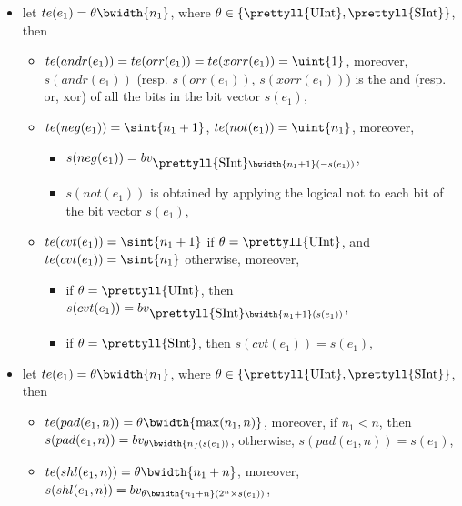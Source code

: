 \begin{itemize}
\begin{itemize}
%
\item $te(dshr(e_1, e_2)) = \theta \bwidth{n_1}$ and $s(dshr(e_1, e_2)) = bv_{\theta \bwidth{n_1}(s(e_1) \div 2^{s(e_2)})}$,
%
\end{itemize}
%
\item let $te(e_1) = \theta \bwidth{n_1}$, where $\theta \in \{\mbox{\prettyll{UInt}}, \mbox{\prettyll{SInt}}\}$, then
\begin{itemize}
\item $te(andr(e_1)) = te(orr(e_1)) =  te(xorr(e_1)) = \uint{1}$, moreover, $s(andr(e_1))$ (resp. $s(orr(e_1))$, $s(xorr(e_1))$) is the and (resp. or, xor) of all the bits in the bit vector $s(e_1)$,
%
\item $te(neg(e_1)) = \sint{n_1 +1}$, $te(not(e_1)) =  \uint{n_1}$, moreover,
\begin{itemize}
\item $s(neg(e_1)) = bv_{\mbox{\prettyll{SInt}}\bwidth{n_1+1}(-s(e_1))}$,
%
\item $s(not(e_1))$ is obtained by applying the logical not to each bit of the bit vector $s(e_1)$,
\end{itemize}
%
%
\item $te(cvt(e_1)) = \sint{n_1 +1}$ if $\theta = \mbox{\prettyll{UInt}}$, and $te(cvt(e_1)) =  \sint{n_1}$ otherwise,  moreover,
\begin{itemize}
\item if $\theta = \mbox{\prettyll{UInt}}$, then $s(cvt(e_1)) = bv_{\mbox{\prettyll{SInt}}\bwidth{n_1+1}(s(e_1))}$,
%
\item if $\theta = \mbox{\prettyll{SInt}}$, then $s(cvt(e_1)) = s(e_1)$,
\end{itemize}
\end{itemize}
%
\item let $te(e_1) = \theta \bwidth{n_1}$, where $\theta \in \{\mbox{\prettyll{UInt}}, \mbox{\prettyll{SInt}}\}$, then
\begin{itemize}
\item $te(pad(e_1, n)) = \theta\bwidth{\max(n_1, n)}$, moreover, if $n_1 < n$, then $s(pad(e_1,n)) = bv_{\theta\bwidth{n}(s(e_1))}$, otherwise, $s(pad(e_1,n)) = s(e_1)$,
%
\item $te(shl(e_1,n)) = \theta \bwidth{n_1 + n}$, moreover, $s(shl(e_1,n)) =  bv_{\theta\bwidth{n_1 + n}(2^{n} \times s(e_1))}$,

\end{itemize}
\end{itemize}
